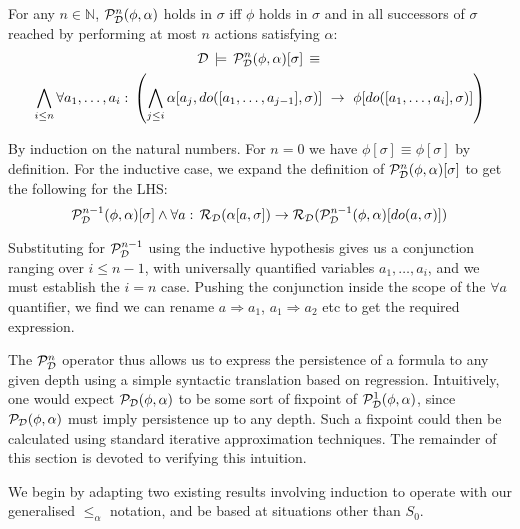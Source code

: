 \begin{thm}
For any $n\in\mathbb{N}$, $\mathcal{P}_{\mathcal{D}}^{n}(\phi,\alpha)$ holds in
$\sigma$ iff $\phi$ holds in $\sigma$ and in all successors of
$\sigma$ reached by performing at most $n$ actions satisfying $\alpha$:\label{thm:PstN-works}\begin{multline*}
\mathcal{D}\,\models\,\mathcal{P}_{\mathcal{D}}^{n}(\phi,\alpha)[\sigma]\,\equiv\,\\
\bigwedge_{i\leq n}\forall a_{1},\dots,a_{i}:\,\left(\bigwedge_{j\leq i}\alpha[a_{j},do([a_{1},\dots,a_{j-1}],\sigma)]\,\,\rightarrow\,\,\phi[do([a_{1},\dots,a_{i}],\sigma)]\right)\end{multline*}

\end{thm}
\begin{proofsketch}
By induction on the natural numbers. For $n=0$ we have $\phi[\sigma]\equiv\phi[\sigma]$
by definition. For the inductive case, we expand the definition of
$\mathcal{P}_{\mathcal{D}}^{n}(\phi,\alpha)[\sigma]$ to get the following for the
LHS:\[
\mathcal{P}_{\mathcal{D}}^{n-1}(\phi,\alpha)[\sigma]\wedge\forall a:\,\mathcal{R}_{\mathcal{D}}(\alpha[a,\sigma])\rightarrow\mathcal{R}_{\mathcal{D}}(\mathcal{P}_{\mathcal{D}}^{n-1}(\phi,\alpha)[do(a,\sigma)])\]


Substituting for $\mathcal{P}_{\mathcal{D}}^{n-1}$ using the inductive hypothesis
gives us a conjunction ranging over $i\leq n-1$, with universally
quantified variables $a_{1},\dots,a_{i}$, and we must establish the
$i=n$ case. Pushing the conjunction inside the scope of the $\forall a$
quantifier, we find we can rename $a\Rightarrow a_{1}$, $a_{1}\Rightarrow a_{2}$
etc to get the required expression. 
\end{proofsketch}
The $\mathcal{P}_{\mathcal{D}}^{n}$ operator thus allows us to express the persistence
of a formula to any given depth using a simple syntactic translation
based on regression. Intuitively, one would expect $\mathcal{P}_{\mathcal{D}}(\phi,\alpha)$
to be some sort of fixpoint of $\mathcal{P}_{\mathcal{D}}^{1}(\phi,\alpha)$, since
$\mathcal{P}_{\mathcal{D}}(\phi,\alpha)$ must imply persistence up to any depth.
Such a fixpoint could then be calculated using standard iterative
approximation techniques. The remainder of this section is devoted
to verifying this intuition.

We begin by adapting two existing results involving induction to operate
with our generalised $\leq_{\alpha}$ notation, and be based at situations
other than $S_{0}$.\\


